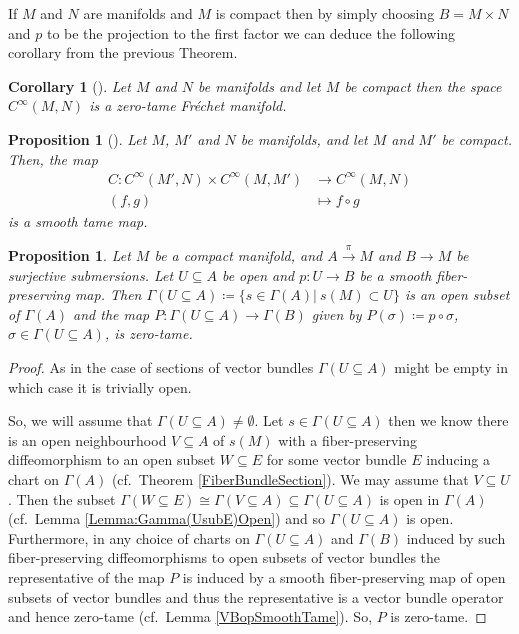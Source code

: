 \documentclass[12pt,a4paper]{article}
\theoremstyle{plain}
\newtheorem{corollary}[theorem]{Corollary}
\newtheorem{proposition}[theorem]{Proposition}
\theoremstyle{definition}
\begin{document}
If $M$ and $N$ are manifolds and $M$ is compact then by simply choosing $B=M\times N$ and $p$ to be the projection to the first factor we can deduce the following corollary from the previous Theorem.
\begin{corollary}[{\cite[Part II, Corollary 2.3.2]{hamilton}}]
\label{Cor:SmoothMapsMfd}
Let $M$ and $N$ be manifolds and let $M$ be compact then the space $C^\infty(M,N)$ is a zero-tame Fréchet manifold.
\end{corollary}

\begin{proposition}[{\cite[Part II, Theorem 2.3.3]{hamilton}}]
\label{Prop:CompSmoothTame}
Let $M$, $M'$ and $N$ be manifolds, and let $M$ and $M'$ be compact. Then, the map 
\begin{align*}
    C: C^\infty(M',N)\times C^\infty(M,M')&\longrightarrow C^\infty(M,N)\\
    (f,g)&\longmapsto f\circ g
\end{align*}
is a smooth tame map.
\end{proposition}



\begin{proposition}
\label{Prop:FiberBundleOperators}
Let $M$ be a compact manifold, and $A\xrightarrow{\pi} M$ and $B\to M$ be surjective submersions. Let $U\subseteq A$ be open and $p:U\to B$ be a smooth fiber-preserving map. Then $\Gamma(U\subseteq A)\coloneqq \{s\in \Gamma(A)|~s(M)\subset U\}$ is an open subset of $\Gamma(A)$ and the map $P:\Gamma(U\subseteq A)\to \Gamma(B)$ given by $P(\sigma)\coloneqq p\circ \sigma$, $\sigma\in \Gamma(U\subseteq A)$, is zero-tame.
\end{proposition}
\begin{proof}
As in the case of sections of vector bundles $\Gamma(U\subseteq A)$ might be empty in which case it is trivially open.

So, we will assume that $\Gamma(U\subseteq A)\neq \emptyset$. Let $s\in \Gamma(U\subseteq A)$ then we know there is an open neighbourhood $V\subseteq A$ of $s(M)$ with a fiber-preserving diffeomorphism to an open subset $W\subseteq E$ for some vector bundle $E$ inducing a chart on $\Gamma(A)$ (cf.~Theorem \ref{FiberBundleSection}). We may assume that $V\subseteq U$. Then the subset $\Gamma(W\subseteq E)\cong \Gamma(V\subseteq A)\subseteq \Gamma(U\subseteq A)$ is open in $\Gamma(A)$ (cf.~Lemma \ref{Lemma:Gamma(UsubE)Open}) and so $\Gamma(U\subseteq A)$ is open.
Furthermore, in any choice of charts on $\Gamma(U\subseteq A)$ and $\Gamma(B)$ induced by such fiber-preserving diffeomorphisms to open subsets of vector bundles the representative of the map $P$ is induced by a smooth fiber-preserving map of open subsets of vector bundles and thus the representative is a vector bundle operator and hence zero-tame (cf.~Lemma \ref{VBopSmoothTame}). So, $P$ is zero-tame.
\end{proof}
\end{document}
